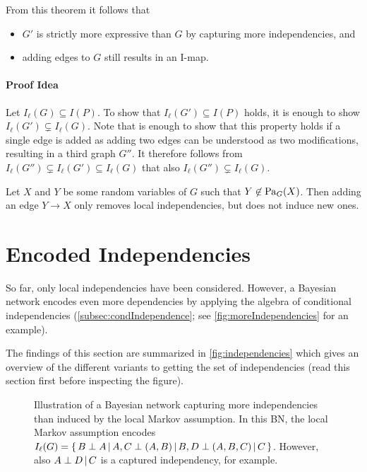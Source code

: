 			From this theorem it follows that
			\begin{itemize}
				\item \(G'\) is strictly more expressive than \(G\) by capturing more independencies, and
				\item adding edges to \(G\) still results in an I-map.
			\end{itemize}

			\paragraph{Proof Idea}
				Let \( I_\ell(G) \subseteq I(P) \). To show that \( I_\ell(G') \subseteq I(P) \) holds, it is enough to show \( I_\ell(G') \subsetneq I_\ell(G) \). Note that is enough to show that this property holds if a single edge is added as adding two edges can be understood as two modifications, resulting in a third graph \(G''\). It therefore follows from \( I_\ell(G'') \subsetneq I_\ell(G') \subseteq I_\ell(G) \) that also \( I_\ell(G'') \subsetneq I_\ell(G) \).

				Let \(X\) and \(Y\) be some random variables of \(G\) such that \( Y \not\in \operatorname{Pa}_G(X) \). Then adding an edge \( Y \to X \) only removes local independencies, but does not induce new ones.


	\section{Encoded Independencies}
		So far, only local independencies have been considered. However, a Bayesian network encodes even more dependencies by applying the algebra of conditional independencies (\autoref{subsec:condIndependence}; see \autoref{fig:moreIndependencies} for an example).

		The findings of this section are summarized in \autoref{fig:independencies} which gives an overview of the different variants to getting the set of independencies (read this section first before inspecting the figure).

		\begin{figure}
			\centering
			\caption[A Bayesian Network Captures More than Local Independencies]{Illustration of a Bayesian network capturing more independencies than induced by the local Markov assumption. In this BN, the local Markov assumption encodes \( I_\ell(G) = \{\, B \perp A \,\vert\, A, C \perp (A, B) \,\vert\, B, D \perp (A, B, C) \,\vert\, C \,\} \). However, also \( A \perp D \,\vert\, C \) is a captured independency, for example.}
			\label{fig:moreIndependencies}
		\end{figure}

